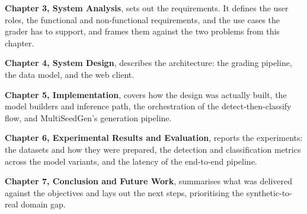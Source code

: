 \textbf{Chapter 3, System Analysis}, sets out the requirements. It defines the user
roles, the functional and non-functional requirements, and the use cases the grader
has to support, and frames them against the two problems from this chapter.

\textbf{Chapter 4, System Design}, describes the architecture: the grading pipeline,
the data model, and the web client.

\textbf{Chapter 5, Implementation}, covers how the design was actually built, the
model builders and inference path, the orchestration of the detect-then-classify
flow, and MultiSeedGen's generation pipeline.

\textbf{Chapter 6, Experimental Results and Evaluation}, reports the experiments:
the datasets and how they were prepared, the detection and classification metrics
across the model variants, and the latency of the end-to-end pipeline.

\textbf{Chapter 7, Conclusion and Future Work}, summarises what was delivered
against the objectives and lays out the next steps, prioritising the
synthetic-to-real domain gap.
